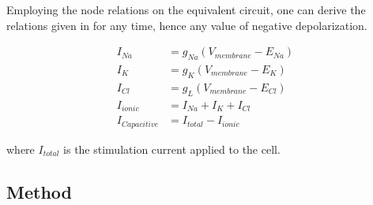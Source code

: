 \documentclass{IEEEtran}
\begin{document}
Employing the node relations on the equivalent circuit, one can derive the relations given in  for any time, hence any value of negative depolarization.

\begin{align}
    I_{Na} &= g_{Na}(V_{membrane} - E_{Na}) \label{eqn:node1}\\
    I_{K} &= g_{K}(V_{membrane} - E_{K}) \label{eqn:node2}\\
    I_{Cl} &= g_{L}(V_{membrane} - E_{Cl}) \label{eqn:node3}\\
    I_{ionic} &= I_{Na} + I_{K} + I_{Cl} \label{eqn:kirch1}\\
    I_{Capacitive} &= I_{total} - I_{ionic} \label{eqn:kirch2}
\end{align}

where $I_{total}$ is the stimulation current applied to the cell. 

\subsection{Method}



\clearpage
\printbibliography{}
\end{document}
